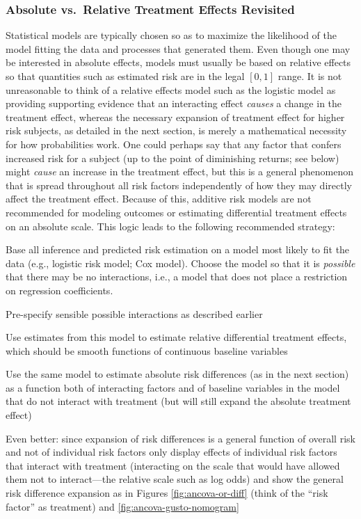 \subsubsection{Absolute vs.\ Relative Treatment Effects Revisited}
Statistical models are typically chosen so as to maximize the
likelihood of the model fitting the data and processes that generated
them.  Even though one may be interested in absolute effects, models
must usually be based on relative effects so that quantities such as
estimated risk are in the legal $[0,1]$ range.  It is not unreasonable
to think of a relative effects model such as the logistic model as
providing supporting evidence that an interacting effect \emph{causes}
a change in the treatment effect, whereas the necessary expansion of
treatment effect for higher risk subjects, as detailed in the next
section, is merely a mathematical necessity for how probabilities
work.  One could perhaps say that any factor that confers increased
risk for a subject (up to the point of diminishing returns; see below)
might \emph{cause} an increase in the treatment effect, but this is a
general phenomenon that is spread throughout all risk factors
independently of how they may directly affect the treatment effect.
Because of this, additive risk models are not recommended for modeling
outcomes or estimating differential treatment effects on an absolute
scale.  This logic leads to the following recommended strategy:
\be
\item Base all inference and predicted risk estimation on a model most
  likely to fit the data (e.g., logistic risk model; Cox model).
  Choose the model so that it is \emph{possible} that there may be no
  interactions, i.e., a model that does not place a restriction on
  regression coefficients.
\item Pre-specify sensible possible interactions as described earlier
\item Use estimates from this model to estimate relative differential
  treatment effects, which should be smooth functions of continuous
  baseline variables
\item Use the same model to estimate absolute risk differences (as in
  the next section) as a function both of interacting factors and of
  baseline variables in the model that do not interact with treatment
  (but will still expand the absolute treatment effect)
\item Even better: since expansion of risk differences is a general
  function of overall risk and not of individual risk factors only
  display effects of individual risk factors that interact with
  treatment (interacting on the scale that would have allowed them not
  to interact---the relative scale such as log odds) and show the
  general risk difference expansion as in Figures
  \ref{fig:ancova-or-diff} (think of the ``risk factor'' as treatment)
  and \ref{fig:ancova-gusto-nomogram}
\ee

